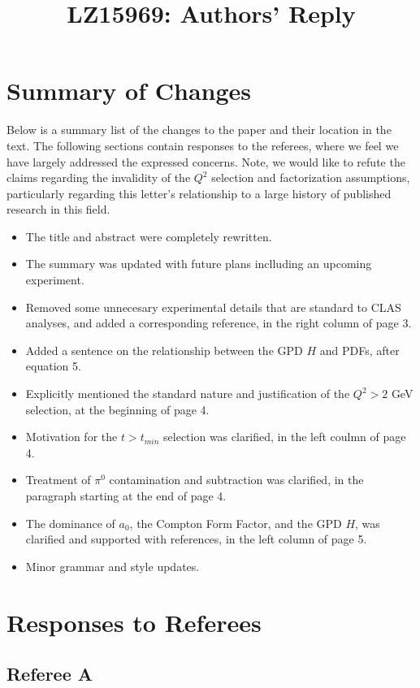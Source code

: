 \documentclass{article}
\title{LZ15969:  Authors' Reply}
\begin{document}
\maketitle

\section{Summary of Changes}
Below is a summary list of the changes to the paper and their location in the text.  The following sections contain responses to the referees, where we feel we have largely addressed the expressed concerns.  Note, we would like to refute the claims regarding the invalidity of the $Q^2$ selection and factorization assumptions, particularly regarding this letter's relationship to a large history of published research in this field.

\begin{itemize}
    \item{The title and abstract were completely rewritten.}
    \item{The summary was updated with future plans inclluding an upcoming experiment.}
    \item{Removed some unnecesary experimental details that are standard to CLAS analyses, and added a corresponding reference, in the right column of page 3.}
    \item{Added a sentence on the relationship between the GPD $H$ and PDFs, after equation 5.}
    \item{Explicitly mentioned the standard nature and justification of the $Q^2>2$ GeV selection, at the beginning of page 4.}
    \item{Motivation for the $t>t_{min}$ selection was clarified, in the left coulmn of page 4.}
    \item{Treatment of $\pi^0$ contamination and subtraction was clarified, in the paragraph starting at the end of page 4.}
    \item{The dominance of $a_0$, the Compton Form Factor, and the GPD $H$, was clarified and supported with references, in the left column of page 5.}
    \item{Minor grammar and style updates.}
\end{itemize}

\section{Responses to Referees}

\subsection{Referee A}
\end{document}
